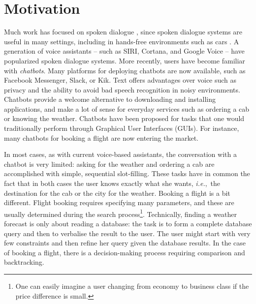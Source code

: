 \documentclass{article}
\theoremstyle{definition}
\begin{document}
\section{Motivation}
Much work has focused on spoken dialogue \citep{Walker:98,Lemon:07,Williams:16}, since spoken dialogue systems are useful in many settings, including in hands-free environments such as cars \citep{Lemon:06}. A generation of voice assistants -- such as SIRI, Cortana, and Google Voice -- have popularized spoken dialogue systems. More recently, users have become familiar with \textit{chatbots}. Many platforms for deploying chatbots are now available, such as Facebook Messenger, Slack, or Kik. Text offers advantages over voice such as privacy and the ability to avoid bad speech recognition in noisy environments. Chatbots provide a welcome alternative to downloading and installing applications, and make a lot of sense for everyday services such as ordering a cab or knowing the weather. Chatbots have been proposed for tasks that one would traditionally perform through Graphical User Interfaces (GUIs). For instance, many chatbots for booking a flight are now entering the market.

In most cases, as with current voice-based assistants, the conversation with a chatbot is very limited: asking for the weather and ordering a cab are accomplished with simple, sequential slot-filling. These tasks have in common the fact that in both cases the user knows exactly what she wants, \textit{i.e.},~the destination for the cab or the city for the weather. Booking a flight is a bit different. Flight booking requires specifying many parameters, and these are usually determined during the search process\footnote{One can easily imagine a user changing from economy to business class if the price difference is small.}. Technically, finding a weather forecast is only about reading a database: the task is to form a complete database query and then to verbalise the result to the user. The user might start with very few constraints and then refine her query given the database results. In the case of booking a flight, there is a decision-making process requiring comparison and backtracking.
\end{document}
